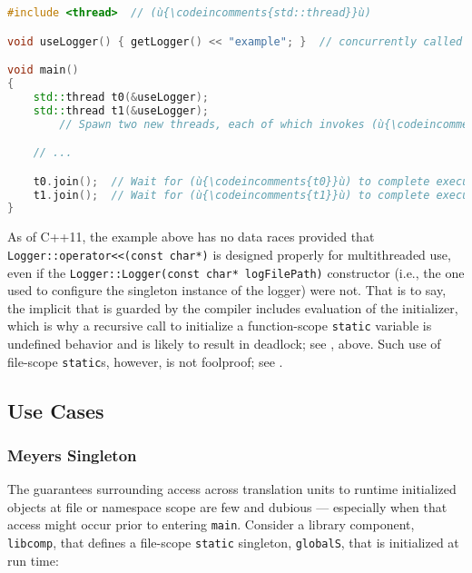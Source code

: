\begin{lstlisting}[language=C++]
#include <thread>  // (ù{\codeincomments{std::thread}}ù)

void useLogger() { getLogger() << "example"; }  // concurrently called function

void main()
{
    std::thread t0(&useLogger);
    std::thread t1(&useLogger);
        // Spawn two new threads, each of which invokes (ù{\codeincomments{useLogger}}ù).

    // ...

    t0.join();  // Wait for (ù{\codeincomments{t0}}ù) to complete execution.
    t1.join();  // Wait for (ù{\codeincomments{t1}}ù) to complete execution.
}
\end{lstlisting}
    
\noindent As of C++11, the example above has no data races provided that
\lstinline!Logger::operator<<(const!~\lstinline!char*)! is designed properly
for multithreaded use, even if the
\lstinline!Logger::Logger(const!~\lstinline!char*!~\lstinline!logFilePath)!
constructor (i.e., the one used to configure the singleton instance of
the logger) were not. That is to say, the implicit  that is guarded by the compiler includes evaluation of the
initializer, which is why a recursive call to initialize a
function-scope \lstinline!static! variable is undefined behavior and is
likely to result in deadlock; see {}, above.
Such use of file-scope \lstinline!static!s, however, is not foolproof; see .

\subsection[Use Cases]{Use Cases}\label{use-cases-functionstatic}

\subsubsection[Meyers Singleton]{Meyers Singleton}\label{meyers-singleton}

The guarantees surrounding access across translation units to runtime
initialized objects at file or namespace scope are few and dubious ---
especially when that access might occur prior to entering \lstinline!main!.
Consider a library component, \lstinline!libcomp!, that defines a
file-scope \lstinline!static! singleton, \lstinline!globalS!, that is
initialized at run time:

